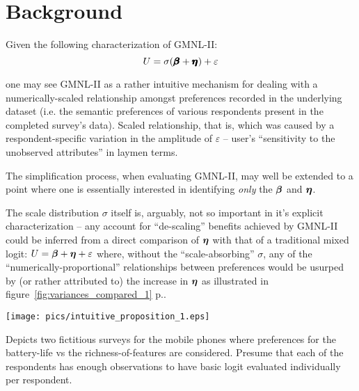 \documentclass[12pt,a4paper]{article}
\begin{document}
\section{Background}

Given the following characterization of GMNL-II:
{ \Large 
\begin{equation}
\label{eq:gmnl_2a_1}
U=\sigma(\pmb{\hm{\beta}}+\pmb{\hm{\eta}}) + \varepsilon
\end{equation}
}

one may see GMNL-II as a rather intuitive mechanism for dealing with a numerically-scaled relationship amongst preferences recorded in the underlying dataset (i.e. the semantic preferences of various respondents present in the completed survey's data). Scaled relationship, that is, which was caused by a respondent-specific variation in the amplitude of  \(\varepsilon\) -- user's ``sensitivity to the unobserved attributes'' in laymen terms.

The simplification process, when evaluating GMNL-II, may well be extended to a point where one is essentially interested in identifying \textit{only} the \(\hm{\beta}\) and \(\hm{\eta}\). 

The scale distribution \(\sigma\) itself is, arguably, not so important in it's explicit characterization -- any  account for ``de-scaling'' benefits achieved by GMNL-II could be inferred from a direct comparison of  \(\hm{\eta}\) with that of a traditional mixed logit: \(U=\hm{\beta}+\hm{\eta} + \varepsilon\) where, without the ``scale-absorbing'' \(\sigma\), any of the ``numerically-proportional'' relationships between preferences would be usurped by (or rather attributed to) the increase in \(\hm{\eta}\) as illustrated in figure~\ref{fig:variances_compared_1} p.\pageref{fig:variances_compared_1}.


\begin{sidewaysfigure}
\begin{framed}
\texttt{[image: pics/intuitive\_proposition\_1.eps]}

Depicts two fictitious surveys for the mobile phones where preferences for the battery-life vs the richness-of-features are considered. Presume that each of the respondents has enough observations to have basic logit evaluated individually per respondent.

\caption{Mixed logit vs GMNL-II and relevant (in)ability to separate scale from variance.} 

\label{fig:variances_compared_1}
\end{framed}
\end{sidewaysfigure}
\end{document}
